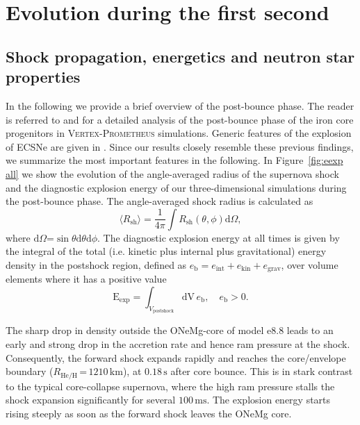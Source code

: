 \documentclass[fleqn,usenatbib]{mnras}
\newcommand{\ud}{\ensuremath{\mathrm{d}}\xspace}
\newcommand{\s}{\ensuremath{\text{s}}}
\newcommand{\vertexprom}{\textsc{Vertex-Prometheus}\xspace}
\newcommand{\onemg}{\ensuremath{\mathrm{e8.8}}\xspace}
\begin{document}
\section{Evolution during the first second}
\label{sec:Evolution during the first second}
\subsection{Shock propagation, energetics and neutron star properties}
In the following we provide a brief overview of the post-bounce phase. The reader
is referred to \cite{Melson2015a} and \cite{Melson2019} for a detailed analysis 
of the post-bounce phase of the iron core progenitors in \vertexprom simulations. 
Generic features of the 
explosion of ECSNe are given in \cite{Kitaura2006,Janka2008,Gessner2018}. 
Since our results closely resemble these previous findings, we summarize the most 
important features in the following.
In Figure~\ref{fig:eexp all} we show the evolution of the angle-averaged radius of the supernova 
shock and the diagnostic explosion energy of our three-dimensional simulations during the post-bounce phase. 
The angle-averaged shock radius is calculated as
\begin{equation}
    \langle R_{\mathrm{sh}} \rangle =  \frac{1}{4\pi}\int R_{\mathrm{sh}}(\theta,\phi)\ud \Omega,
    \label{equ:avg rsh}
\end{equation}
where $\ud \Omega\mathord{=}\sin{\theta}\ud\theta\ud\phi$.
The diagnostic explosion energy at all times is given by the integral
of the total (i.e. kinetic plus internal plus gravitational) energy density
in the postshock region, defined as 
$e_{\text{b}} = e_{\mathrm{int}} + e_{\mathrm{kin}} + e_{\text{grav}}$, 
over volume elements where it has a positive value 
\begin{equation}
    \mathrm{E}_{\mathrm{exp}} = \int_{V_{\mathrm{postshock}}}
    \mathrm{dV}\, e_{\mathrm{b}} ,\quad e_{\mathrm{b}} > 0.
    \label{equ:ene exp}
\end{equation}

The sharp drop in density outside the ONeMg-core of model \onemg 
leads to an early and strong drop in the accretion rate and hence 
ram pressure at the shock.
Consequently, the forward shock expands rapidly and reaches the 
core/envelope boundary ($R_{\mathrm{He/H}}\,\mathord{=}\,1210\,\text{km}$), 
at $0.18\,\s$ after core bounce.
This is in stark contrast to the typical core-collapse supernova, where the 
high ram pressure stalls the shock expansion significantly for several 
$100\,\text{ms}$. The explosion energy starts rising steeply as soon 
as the forward shock leaves the ONeMg core.
\end{document}
